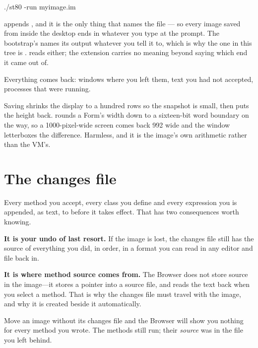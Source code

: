 \begin{sh}
./st80 -run myimage.im
\end{sh}

\begin{stnote}
 appends , and it is the only thing
that names the file --- so every image saved from inside the desktop ends in
 whatever you type at the prompt. The bootstrap's  names its
output whatever you tell it to, which is why the one in this tree is
.  reads either; the extension carries no meaning
beyond saying which end it came out of.
\end{stnote}

Everything comes back: windows where you left them, text you had not accepted,
processes that were running.

\begin{stnote}
Saving shrinks the display to a hundred rows so the snapshot is small, then
puts the height back.  rounds a Form's width down to a
sixteen-bit word boundary on the way, so a 1000-pixel-wide screen comes back
992 wide and the window letterboxes the difference. Harmless, and it is the
image's own arithmetic rather than the VM's.
\end{stnote}

\section{The changes file}

Every method you accept, every class you define and every expression you
 is appended, as text, to  before it takes
effect. That has two consequences worth knowing.

\textbf{It is your undo of last resort.} If the image is lost, the changes
file still has the source of everything you did, in order, in a format you can
read in any editor and file back in.

\textbf{It is where method source comes from.} The Browser does not store
source in the image---it stores a pointer into a source file, and reads the
text back when you select a method. That is why the changes file must travel
with the image, and why it is created beside it automatically.

\begin{stwarn}
Move an image without its changes file and the Browser will show you nothing
for every method you wrote. The methods still run; their \emph{source} was in
the file you left behind.
\end{stwarn}

